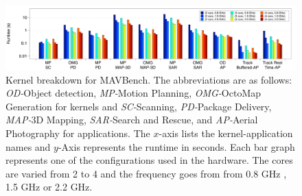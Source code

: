 \begin{figure}[!t]
\centering
\includegraphics[width=\columnwidth]{figs/kernel-breakdown_2}
\vspace{-18pt}
\caption{Kernel breakdown for MAVBench. The abbreviations are as follows: \emph{OD-}Object detection, \emph{MP-}Motion Planning, \emph{OMG-}OctoMap Generation for kernels and \emph{SC-}Scanning, \emph{PD-}Package Delivery,  \emph{MAP-}3D Mapping, \emph{SAR-}Search and Rescue, and \emph{AP-}Aerial Photography for applications. The $x$-axis lists the kernel-application names and $y$-Axis represents the runtime in seconds. Each bar graph represents one of the configurations used in the hardware. The cores are varied from 2 to 4 and the frequency goes from from 0.8 GHz , 1.5 GHz or 2.2 GHz.}
\label{fig:kernel-breakdown}
\end{figure}

   





